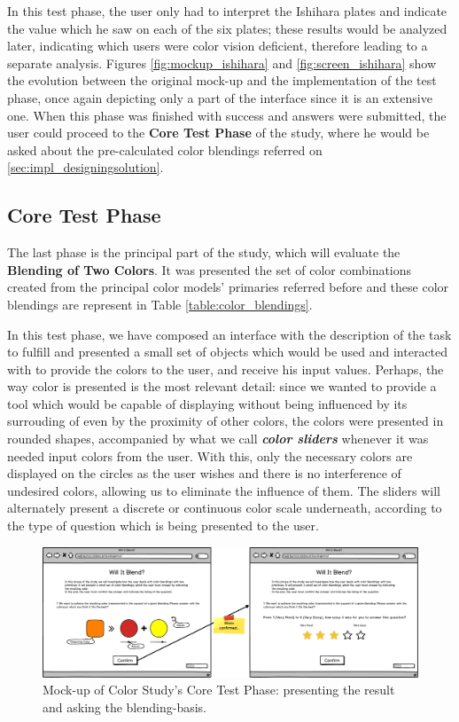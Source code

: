 %
In this test phase, the user only had to interpret the Ishihara plates and indicate the value which he saw on each of the six plates; these results would be
analyzed later, indicating which users were color vision deficient, therefore leading to a separate analysis. Figures \ref{fig:mockup_ishihara} and
\ref{fig:screen_ishihara} show the evolution between the original mock-up and the implementation of the test phase, once again depicting only a part of the
interface since it is an extensive one.
%
When this phase was finished with success and answers were submitted, the user could proceed to the \textbf{Core Test Phase} of the study, where he would be asked
about the pre-calculated color blendings referred on \ref{sec:impl_designingsolution}.
%
%
\subsection{Core Test Phase}
\label{subsec:design_core}
%
The last phase is the principal part of the study, which will evaluate the \textbf{Blending of Two Colors}. It was presented the set of color combinations
created from the principal color models' primaries referred before and these color blendings are represent in Table \ref{table:color_blendings}. \par
%
In this test phase, we have composed an interface with the description of the task to fulfill and presented a small set of objects which would be used and
interacted with to provide the colors to the user, and receive his input values. Perhaps, the way color is presented is the most relevant detail: since we
wanted to provide a tool which would be capable of displaying without being influenced by its surrouding of even by the proximity of other colors, the colors
were presented in rounded shapes, accompanied by what we call \emph{\textbf{color sliders}} whenever it was needed input colors from the user. With this,
only the necessary colors are displayed on the circles as the user wishes and there is no interference of undesired colors, allowing us to eliminate the
influence of them. The sliders will alternately present a discrete or continuous color scale underneath, according to the type of question which is being
presented to the user. \par
%
\begin{figure}[htbp]
	\centering
  \includegraphics[width=\textwidth]{images/implementation/mockup_core_objTwoColors.png}
  \caption[Mock-up of Color Study's Core Test Phase: presenting the result and asking the blending-basis.]{Mock-up of Color Study's Core
	Test Phase: presenting the result and asking the blending-basis.}
  \label{fig:mockup_core_1}
\end{figure} \par
